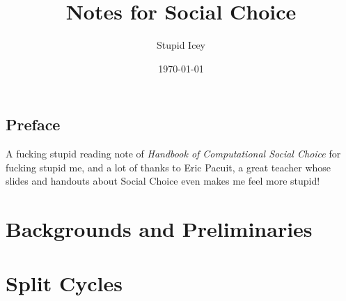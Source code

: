 \documentclass[a4paper,12pt,oneside]{book}
\title{Notes for Social Choice}
\author{Stupid Icey}
\date{\today}
\begin{document}
\maketitle


\chapter*{Preface}

A fucking stupid reading note of \textit{Handbook of Computational Social Choice} \parencite{moulin2016} for fucking stupid me, and a lot of thanks to Eric Pacuit, a great teacher whose slides and handouts about Social Choice even makes me feel more stupid!


\tableofcontents

\part{Backgrounds and Preliminaries}







\part{Split Cycles}





\printbibliography
\end{document}
